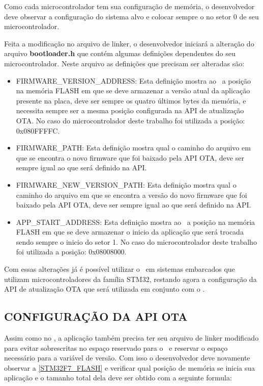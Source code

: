 Como cada microcontrolador tem sua configuração de memória, o desenvolvedor deve observar a configuração do sistema alvo e colocar sempre o \bootloader no setor 0 de seu microcontrolador.

Feita a modificação no arquivo de linker, o desenvolvedor iniciará a alteração do arquivo \textbf{bootloader.h} que contém algumas definições dependentes do seu microcontrolador. Neste arquivo as definições que precisam ser alteradas são:
\begin{itemize}
    \item FIRMWARE\_VERSION\_ADDRESS: Esta definição mostra ao \bootloader\ a posição na memória FLASH em que se deve armazenar a versão atual da aplicação presente na placa, deve ser sempre os quatro últimos bytes da memória, e necessita sempre ser a mesma posição configurada na API de atualização OTA. No caso do microcontrolador deste trabalho foi utilizada a posição: 0x080FFFFC.
    \item FIRMWARE\_PATH: Esta definição mostra qual o caminho do arquivo em que se encontra o novo firmware que foi baixado pela API OTA, deve ser sempre igual ao que será definido na API.
    \item FIRMWARE\_NEW\_VERSION\_PATH: Esta definição mostra qual o caminho do arquivo em que se encontra a versão do novo firmware que foi baixado pela API OTA, deve ser sempre igual ao que será definido na API.
    \item APP\_START\_ADDRESS: Esta definição mostra ao \bootloader\ a posição na memória FLASH em que se deve armazenar o inicio da aplicação que será trocada sendo sempre o inicio do setor 1. No caso do microcontrolador deste trabalho foi utilizada a posição: 0x08008000.
   
\end{itemize}

Com essas alterações já é possível utilizar o \bootloader\ em sistemas embarcados que utilizam microcontroladores da família STM32, restando agora a configuração da API de atualização OTA que será utilizada em conjunto com o \bootloader.

\subsection{CONFIGURAÇÃO DA API OTA}
Assim como no \bootloader, a aplicação também precisa ter seu arquivo de linker modificado para evitar sobrescritas no espaço reservado para o \bootloader\ e reservar o espaço necessário para a variável de versão. Com isso o desenvolvedor deve novamente observar a \autoref{STM32F7_FLASH} e verificar qual posição de memória se inicia sua aplicação e o tamanho total dela deve ser obtido com a seguinte formula:

